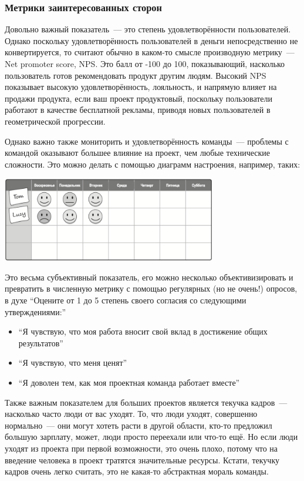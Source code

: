 \documentclass{../../text-style}
\begin{document}
\subsubsection{Метрики заинтересованных сторон}

Довольно важный показатель~--- это степень удовлетворённости пользователей. Однако поскольку удовлетворённость пользователей в деньги непосредственно не конвертируется, то считают обычно в каком-то смысле производную метрику~--- Net promoter score, NPS. Это балл от -100 до 100, показывающий, насколько пользователь готов рекомендовать продукт другим людям. Высокий NPS показывает высокую удовлетворённость, лояльность, и напрямую влияет на продажи продукта, если ваш проект продуктовый, поскольку пользователи работают в качестве бесплатной рекламы, приводя новых пользователей в геометрической прогрессии.

Однако важно также мониторить и удовлетворённость команды~--- проблемы с командой оказывают большее влияние на проект, чем любые технические сложности. Это можно делать с помощью диаграмм настроения, например, таких:

\begin{center}
    \includegraphics[width=0.7\textwidth]{moodChart.png}
\end{center}

Это весьма субъективный показатель, его можно несколько объективизировать и превратить в численную метрику с помощью регулярных (но не очень!) опросов, в духе \enquote{Оцените от 1 до 5 степень своего согласия со следующими утверждениями:}

\begin{itemize}
    \item \enquote{Я чувствую, что моя работа вносит свой вклад в достижение общих результатов}
    \item \enquote{Я чувствую, что меня ценят}
    \item \enquote{Я доволен тем, как моя проектная команда работает вместе}
\end{itemize}

Также важным показателем для больших проектов является текучка кадров~--- насколько часто люди от вас уходят. То, что люди уходят, совершенно нормально~--- они могут хотеть расти в другой области, кто-то предложил большую зарплату, может, люди просто переехали или что-то ещё. Но если люди уходят из проекта при первой возможности, это очень плохо, потому что на введение человека в проект тратятся значительные ресурсы. Кстати, текучку кадров очень легко считать, это не какая-то абстрактная мораль команды.
\end{document}
